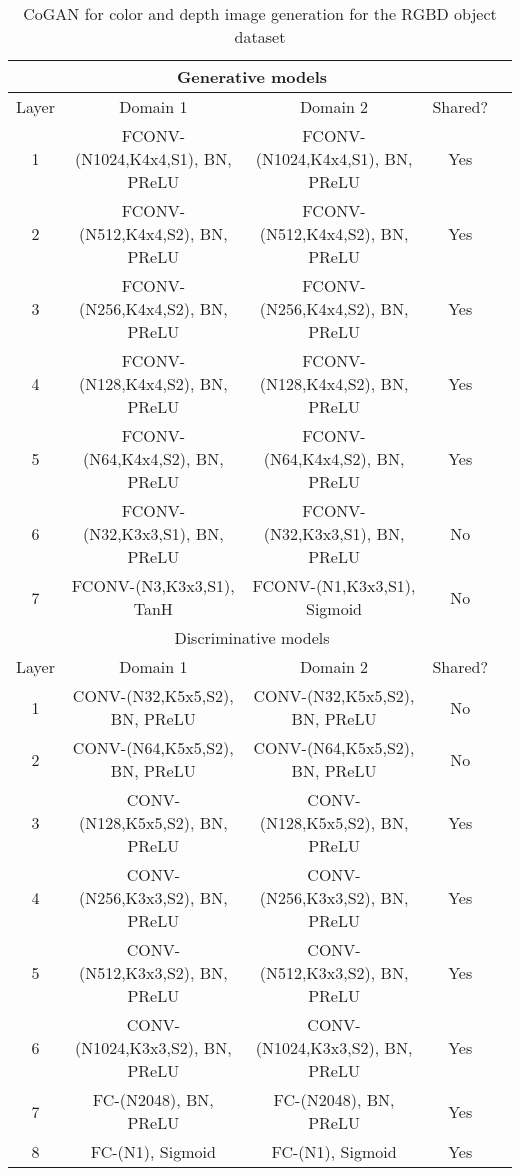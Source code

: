 \begin{table*}[thb!]
\small
\centering
{
\caption{CoGAN for color and depth image generation for the RGBD object dataset}
\label{tbl::rgbd_g}
\begin{tabular}{|c|c|c|c|c|}
\hline
\multicolumn{4}{|c|}{Generative models}\\
\hline\rule{0pt}{2ex}    
Layer &  Domain 1 & Domain 2 & Shared? \\
\hline 
1 &  FCONV-(N1024,K4x4,S1), BN, PReLU & FCONV-(N1024,K4x4,S1), BN, PReLU & Yes\\
2 &  FCONV-(N512,K4x4,S2), BN, PReLU & FCONV-(N512,K4x4,S2), BN, PReLU & Yes\\
3 &  FCONV-(N256,K4x4,S2), BN, PReLU & FCONV-(N256,K4x4,S2), BN, PReLU & Yes\\
4 &  FCONV-(N128,K4x4,S2), BN, PReLU & FCONV-(N128,K4x4,S2), BN, PReLU & Yes\\
5 &  FCONV-(N64,K4x4,S2), BN, PReLU & FCONV-(N64,K4x4,S2), BN, PReLU & Yes\\
6 &  FCONV-(N32,K3x3,S1), BN, PReLU & FCONV-(N32,K3x3,S1), BN, PReLU & No\\
7 &  FCONV-(N3,K3x3,S1), TanH & FCONV-(N1,K3x3,S1), Sigmoid & No\\
\hline
\hline
\multicolumn{4}{|c|}{Discriminative models}\\
\hline\rule{0pt}{2ex} 
Layer &  Domain 1 & Domain 2 & Shared? \\
\hline
1 & CONV-(N32,K5x5,S2), BN, PReLU & CONV-(N32,K5x5,S2), BN, PReLU &No\\
2 & CONV-(N64,K5x5,S2), BN, PReLU & CONV-(N64,K5x5,S2), BN, PReLU &No\\
3 & CONV-(N128,K5x5,S2), BN, PReLU & CONV-(N128,K5x5,S2), BN, PReLU &Yes\\
4 & CONV-(N256,K3x3,S2), BN, PReLU & CONV-(N256,K3x3,S2), BN, PReLU &Yes\\
5 & CONV-(N512,K3x3,S2), BN, PReLU & CONV-(N512,K3x3,S2), BN, PReLU &Yes\\
6 & CONV-(N1024,K3x3,S2), BN, PReLU & CONV-(N1024,K3x3,S2), BN, PReLU &Yes\\
7 & FC-(N2048), BN, PReLU & FC-(N2048), BN, PReLU &Yes\\
8 & FC-(N1), Sigmoid & FC-(N1), Sigmoid &Yes\\
\hline
\end{tabular}
}
\end{table*}


